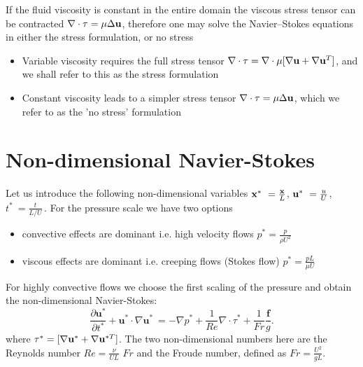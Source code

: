 If the fluid viscosity is constant in the entire domain the viscous stress tensor can be contracted \(\nabla\cdot\tau=\mu\Delta \mathbf{u}\), therefore one may solve the Navier--Stokes equations in either the stress formulation, or no stress

\begin{itemize}
\item Variable viscosity requires the full stress tensor \(\nabla \cdot \tau=\nabla \cdot \mu[\nabla \mathbf{u}+\nabla \mathbf{u}^{T}]\), and we shall refer to this as the stress formulation
\item Constant viscosity leads to a simpler stress tensor \(\nabla \cdot \tau=\mu\Delta \mathbf{u}\), which we refer to as the 'no stress' formulation
\end{itemize}

\section{Non-dimensional Navier-Stokes}
Let us introduce the following non-dimensional variables \(\mathbf{x}^*\ = \frac{\mathbf{x}}{L}\), \(\mathbf{u}^*\ = \frac{u}{U}\), \(t^*\ = \frac{t}{L/U}\,\).
For the pressure scale we have two options 
\begin{itemize}
\item convective effects are dominant i.e. high velocity flows
\( p^* = \frac{p}{\rho U^2} \)
\item viscous effects are dominant i.e. creeping flows (Stokes flow)
\( p^* = \frac{p L}{\mu U} \)
\end{itemize}
For highly convective flows we choose the first scaling of the pressure and obtain the non-dimensional Navier-Stokes:
\begin{equation}\label{eq:NS_nondim}
\frac{\partial \mathbf{u^*}}{\partial t^*} + \mathbf{u^*} \cdot \nabla \mathbf{u^*}\ = -\nabla p^* + \frac{1}{Re} \nabla\cdot \tau^* + \frac{1}{Fr}\frac{\mathbf{f}}{g}.
\end{equation}
where \( \tau^*=[\nabla \mathbf{u}^*+\nabla \mathbf{u}^{*T}]\).
The two non-dimensional numbers here are the Reynolds number \(Re=\frac{\nu}{U L}\) \(Fr\) and the Froude number, defined as \(Fr = \frac{U^2}{gL}\).
%
